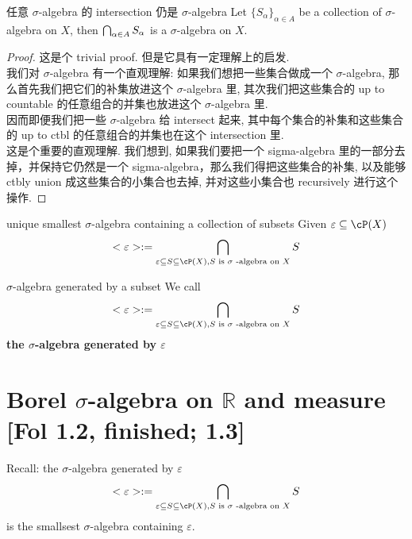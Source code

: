 \documentclass[lang=cn,11pt]{elegantbook}
\begin{document}
\begin{lemma}{任意 $\sigma$-algebra 的 intersection 仍是 $\sigma$-algebra}
Let $\{S_\alpha \}_{\alpha \in A}$ be a collection of $\sigma$-algebra on $X$, then $\bigcap_{\alpha \in A} S_\alpha$ is a $\sigma$-algebra on $X$. 
\end{lemma}
\begin{proof}
    这是个 trivial proof. 但是它具有一定理解上的启发.\\
    我们对 $\sigma$-algebra 有一个直观理解: 如果我们想把一些集合做成一个 $\sigma$-algebra, 那么首先我们把它们的补集放进这个 $\sigma$-algebra 里, 其次我们把这些集合的 up to countable 的任意组合的并集也放进这个 $\sigma$-algebra 里.\\
    因而即便我们把一些 $\sigma$-algebra 给 intersect 起来, 其中每个集合的补集和这些集合的 up to ctbl 的任意组合的并集也在这个 intersection 里.\\
    这是个重要的直观理解. 我们想到, 如果我们要把一个 sigma-algebra 里的一部分去掉，并保持它仍然是一个 sigma-algebra，那么我们得把这些集合的补集, 以及能够 ctbly union 成这些集合的小集合也去掉, 并对这些小集合也 recursively 进行这个操作.
\end{proof}

\begin{corollary}{unique smallest $\sigma$-algebra containing a collection of subsets}
    Given $\varepsilon  \sub \cP(X)$
    $$
    <\varepsilon> := \intsec_{\varepsilon  \sub S \sub \cP(X), \newline S \text{ is }\sigma \text{ -algebra on } X} S
    $$
\end{corollary}

\begin{definition}{$\sigma$-algebra generated by a subset}
We call  $$
    <\varepsilon> := \intsec_{\varepsilon  \sub S \sub \cP(X), \newline S \text{ is }\sigma \text{ -algebra on } X} S
    $$ \textbf{the $\sigma$-algebra generated by $\varepsilon$ }
\end{definition}



\chapter{Borel $\sigma$-algebra on $\mathbb{R}$ and measure [Fol 1.2, finished; 1.3]}
\noindent Recall: the $\sigma$-algebra generated by $\varepsilon$
    $$
    <\varepsilon> := \intsec_{\varepsilon  \sub S \sub \cP(X), \newline S \text{ is }\sigma \text{ -algebra on } X} S
    $$ is the smallsest $\sigma$-algebra containing $\varepsilon$.
\end{document}
